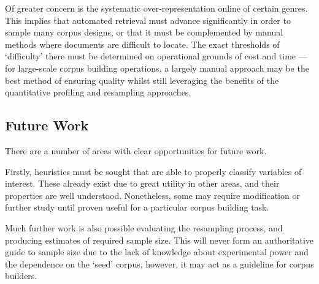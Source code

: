 Of greater concern is the systematic over-representation online of certain genres.  This implies that automated retrieval must advance significantly in order to sample many corpus designs, or that it must be complemented by manual methods where documents are difficult to locate.  The exact thresholds of `difficulty' there must be determined on operational grounds of cost and time --- for large-scale corpus building operations, a largely manual approach may be the best method of ensuring quality whilst still leveraging the benefits of the quantitative profiling and resampling approaches.





\noindent\makebox[\linewidth]{\rule{\paperwidth}{0.4pt}}






%
%




\subsection{Future Work}

There are a number of areas with clear opportunities for future work.

Firstly, heuristics must be sought that are able to properly classify variables of interest.  These already exist due to great utility in other areas, and their properties are well understood.  Nonetheless, some may require modification or further study until proven useful for a particular corpus building task.

Much further work is also possible evaluating the resampling process, and producing estimates of required sample size.  This will never form an authoritative guide to sample size due to the lack of knowledge about experimental power and the dependence on the `seed' corpus, however, it may act as a guideline for corpus builders.

